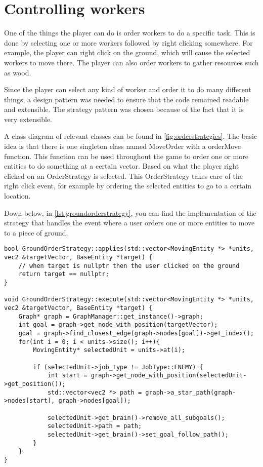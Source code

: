 \section{Controlling workers}

One of the things the player can do is order workers to do a specific task. 
This is done by selecting one or more workers followed by right clicking 
somewhere. For example, the player can right click on the ground, which will 
cause the selected workers to move there. The player can also order workers 
to gather resources such as wood.

Since the player can select any kind of worker and order it to do many 
different things, a design pattern was needed to ensure that the code 
remained readable and extensible. The strategy pattern was chosen because of 
the fact that it is very extensible. 

A class diagram of relevant classes can be found in 
\cref{fig:orderstrategies}. The basic idea is that there is one singleton 
class named MoveOrder with a orderMove function. This function can be used 
throughout the game to order one or more entities to do something at a 
certain vector. Based on what the player right clicked on an OrderStrategy 
is selected. This OrderStrategy takes care of the right click event, for 
example by ordering the selected entities to go to a certain location.

Down below, in \cref{lst:groundorderstrategy}, you can find the implementation of 
the strategy that handles the event where a user orders one or more entities 
to move to a piece of ground.
\\
\begin{lstlisting}[caption={GroundOrderStrategy implementation.},
label={lst:groundorderstrategy}]
bool GroundOrderStrategy::applies(std::vector<MovingEntity *> *units, vec2 &targetVector, BaseEntity *target) {
    // when target is nullptr then the user clicked on the ground
    return target == nullptr;
}

void GroundOrderStrategy::execute(std::vector<MovingEntity *> *units, vec2 &targetVector, BaseEntity *target) {
    Graph* graph = GraphManager::get_instance()->graph;
    int goal = graph->get_node_with_position(targetVector);
    goal = graph->find_closest_edge(graph->nodes[goal])->get_index();
    for(int i = 0; i < units->size(); i++){
        MovingEntity* selectedUnit = units->at(i);

        if (selectedUnit->job_type != JobType::ENEMY) {
            int start = graph->get_node_with_position(selectedUnit->get_position());
            std::vector<vec2 *> path = graph->a_star_path(graph->nodes[start], graph->nodes[goal]);

            selectedUnit->get_brain()->remove_all_subgoals();
            selectedUnit->path = path;
            selectedUnit->get_brain()->set_goal_follow_path();
        }
    }
}
\end{lstlisting}
